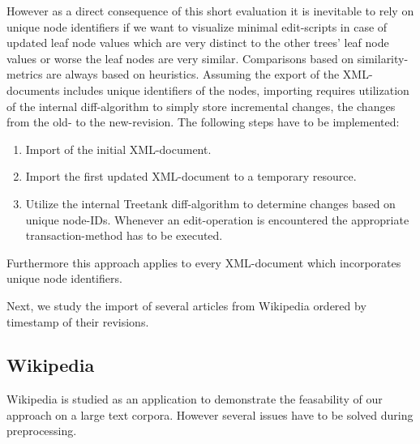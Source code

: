 However as a direct consequence of this short evaluation it is inevitable to rely on unique node identifiers if we want to visualize minimal edit-scripts in case of updated leaf node values which are very distinct to the other trees' leaf node values or worse the leaf nodes are very similar. Comparisons based on similarity-metrics are always based on heuristics. Assuming the export of the XML-documents includes unique identifiers of the nodes, importing requires utilization of the internal diff-algorithm to simply store incremental changes, the changes from the old- to the new-revision. The following steps have to be implemented:

\begin{enumerate}
\item Import of the initial XML-document.
\item Import the first updated XML-document to a temporary resource.
\item Utilize the internal Treetank diff-algorithm to determine changes based on unique node-IDs. Whenever an edit-operation is encountered the appropriate transaction-method has to be executed. %
\end{enumerate}

Furthermore this approach applies to every XML-document which incorporates unique node identifiers.

Next, we study the import of several articles from Wikipedia ordered by timestamp of their revisions. 

\subsection{Wikipedia}
Wikipedia is studied as an application to demonstrate the feasability of our approach on a large text corpora. However several issues have to be solved during preprocessing.

